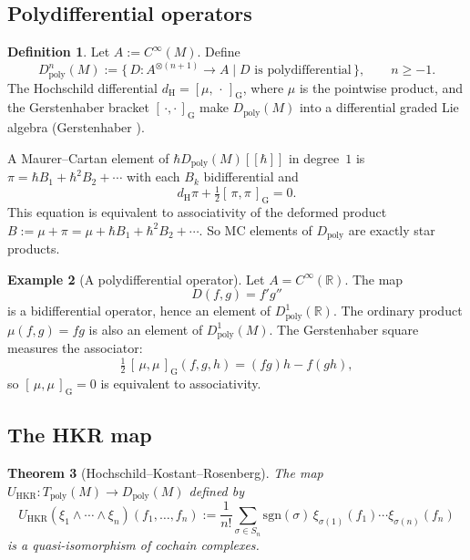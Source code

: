 \documentclass[11pt,a4paper]{article}
\newtheorem{theorem}{Theorem}[section]
\theoremstyle{definition}
\newtheorem{definition}[theorem]{Definition}
\newtheorem{example}[theorem]{Example}
\newcommand{\R}{\mathbb{R}}
\newcommand{\Tpoly}{T_{\mathrm{poly}}}
\newcommand{\Dpoly}{D_{\mathrm{poly}}}
\newcommand{\Cinfty}{C^{\infty}}
\newcommand{\Ger}[2]{[\,#1,#2\,]_{\mathrm{G}}}
\begin{document}
\subsection{Polydifferential operators}\label{ssec:Dpoly}

\begin{definition}\label{def:Dpoly}
Let $A := \Cinfty(M)$. Define
\[
\Dpoly^{n}(M) := \bigl\{\,D \colon A^{\otimes (n+1)} \to A \;\big|\;
D \text{ is polydifferential}\,\bigr\}, \qquad n \ge -1.
\]
The Hochschild differential $d_{\mathrm{H}} = [\mu, \,\cdot\,]_{\mathrm{G}}$,
where $\mu$ is the pointwise product, and the Gerstenhaber bracket
$\Ger{\cdot}{\cdot}$ make $\Dpoly(M)$ into a differential graded Lie
algebra (Gerstenhaber \cite[\S6]{Gerstenhaber1963}).
\end{definition}

A Maurer--Cartan element of $\hbar\Dpoly(M)[[\hbar]]$ in degree~$1$ is
$\pi = \hbar B_{1} + \hbar^{2} B_{2} + \cdots$ with each $B_{k}$
bidifferential and
\[
d_{\mathrm{H}}\pi + \tfrac{1}{2}\Ger{\pi}{\pi}=0.
\]
This equation is equivalent to associativity of the deformed product
$B := \mu + \pi = \mu + \hbar B_{1} + \hbar^{2} B_{2} + \cdots$. So
MC elements of $\Dpoly$ are exactly star products.

\begin{example}[A polydifferential operator]
\label{ex:polydifferential}
Let $A=\Cinfty(\R)$. The map
\[
D(f,g)=f'g''
\]
is a bidifferential operator, hence an element of $\Dpoly^1(\R)$.
The ordinary product $\mu(f,g)=fg$ is also an element of $\Dpoly^1(M)$.
The Gerstenhaber square measures the associator:
\[
\tfrac{1}{2}\,\Ger{\mu}{\mu}(f,g,h) = (fg)h - f(gh),
\]
so $\Ger{\mu}{\mu}=0$ is equivalent to associativity.
\end{example}

\subsection{The HKR map}\label{ssec:HKR}

\begin{theorem}[Hochschild--Kostant--Rosenberg]\label{thm:HKR}
The map $U_{\mathrm{HKR}} \colon \Tpoly(M) \to \Dpoly(M)$ defined by
\[
U_{\mathrm{HKR}}(\xi_{1} \wedge \cdots \wedge \xi_{n})(f_{1}, \dots, f_{n})
:= \frac{1}{n!} \sum_{\sigma \in S_{n}} \mathrm{sgn}(\sigma)\,
\xi_{\sigma(1)}(f_{1}) \cdots \xi_{\sigma(n)}(f_{n})
\]
is a quasi-isomorphism of cochain complexes.
\end{theorem}
\end{document}
